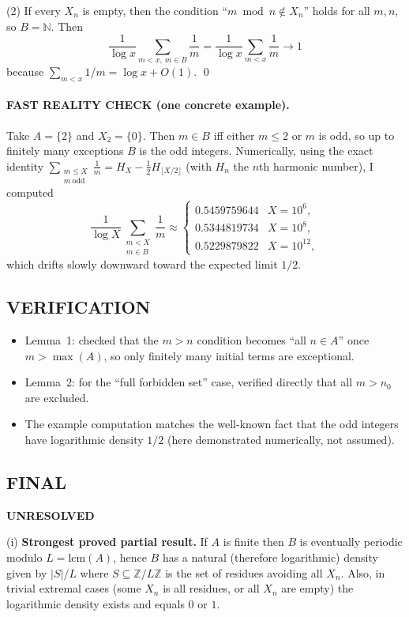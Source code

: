(2) If every $X_n$ is empty, then the condition ``$m\bmod n\not\in X_n$'' holds for all $m,n$, so $B=\mathbb{N}$. Then
\[\frac{1}{\log x}\sum_{m<x,\,m\in B}\frac{1}{m}=\frac{1}{\log x}\sum_{m<x}\frac{1}{m}\to 1\]
because $\sum_{m<x}1/m = \log x + O(1)$.
\qed

\paragraph{FAST REALITY CHECK (one concrete example).}
Take $A=\{2\}$ and $X_2=\{0\}$.
Then $m\in B$ iff either $m\le 2$ or $m$ is odd, so up to finitely many exceptions $B$ is the odd integers.
Numerically, using the exact identity $\sum_{\substack{m\le X\\ m\ \mathrm{odd}}} \frac1m = H_X - \tfrac12 H_{\lfloor X/2\rfloor}$ (with $H_n$ the $n$th harmonic number), I computed
\[
\frac{1}{\log X}\sum_{\substack{m<X\\ m\in B}}\frac1m\approx
\begin{cases}
0.5459759644 & X=10^6,\\
0.5344819734 & X=10^8,\\
0.5229879822 & X=10^{12},
\end{cases}
\]
which drifts slowly downward toward the expected limit $1/2$.

\subsection*{VERIFICATION}
\begin{itemize}
\item Lemma~1: checked that the $m>n$ condition becomes ``all $n\in A$'' once $m>\max(A)$, so only finitely many initial terms are exceptional.
\item Lemma~2: for the ``full forbidden set'' case, verified directly that all $m>n_0$ are excluded.
\item The example computation matches the well-known fact that the odd integers have logarithmic density $1/2$ (here demonstrated numerically, not assumed).
\end{itemize}

\subsection*{FINAL}
\textbf{UNRESOLVED}

(i) \textbf{Strongest proved partial result.} If $A$ is finite then $B$ is eventually periodic modulo $L=\mathrm{lcm}(A)$, hence $B$ has a natural (therefore logarithmic) density given by $|S|/L$ where $S\subseteq\mathbb{Z}/L\mathbb{Z}$ is the set of residues avoiding all $X_n$.
Also, in trivial extremal cases (some $X_n$ is all residues, or all $X_n$ are empty) the logarithmic density exists and equals $0$ or $1$.

